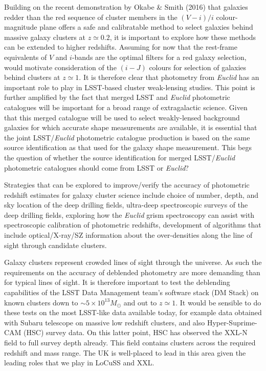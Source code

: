 \documentclass[a4paper,11pt]{article}
\begin{document}
Building on the recent demonstration by Okabe \& Smith (2016) that
galaxies redder than the red sequence of cluster members in the
$(V-i)/i$ colour-magnitude plane offers a safe and calibratable method
to select galaxies behind massive galaxy clusters at $z\simeq0.2$, it
is important to explore how these methods can be extended to higher
redshifts.  Assuming for now that the rest-frame equivalents of $V$
and $i$-bands are the optimal filters for a red galaxy selection,
would motivate consideration of the $(i-J)$ colours for selection of
galaxies behind clusters at $z\simeq1$.  It is therefore clear that
photometry from \emph{Euclid} has an important role to play in
LSST-based cluster weak-lensing studies.  This point is further
amplified by the fact that merged LSST and \emph{Euclid} photometric
catalogues will be important for a broad range of extragalactic
science.  Given that this merged catalogue will be used to select
weakly-lensed background galaxies for which accurate shape
measurements are available, it is essential that the joint
LSST/\emph{Euclid} photometric catalogue production is based on the
same source identification as that used for the galaxy shape
measurement.  This begs the question of whether the source
identification for merged LSST/\emph{Euclid} photometric catalogues
should come from LSST or \emph{Euclid}?

Strategies that can be explored to improve/verify the accuracy of
photometric redshift estimates for galaxy cluster science include
choice of number, depth, and sky location of the deep drilling fields,
ultra-deep spectroscopic surveys of the deep drilling fields,
exploring how the \emph{Euclid} grism spectroscopy can assist with
spectroscopic calibration of photometric redshifts, development of
algorithms that include optical/X-ray/SZ information about the
over-densities along the line of sight through candidate clusters.

Galaxy clusters represent crowded lines of sight through the universe.
As such the requirements on the accuracy of deblended photometry are
more demanding than for typical lines of sight.  It is therefore
important to test the deblending capabilities of the LSST Data
Management team's software stack (DM Stack) on known clusters down to
$\sim5\times10^{13}M_\odot$ and out to $z\simeq1$.  It would be
sensible to do these tests on the most LSST-like data available today,
for example data obtained with Subaru telescope on massive low
redshift clusters, and also Hyper-Suprime-CAM (HSC) survey data.  On
this latter point, HSC has observed the XXL-N field to full survey
depth already.  This field contains clusters across the required
redshift and mass range.  The UK is well-placed to lead in this area
given the leading roles that we play in LoCuSS and XXL.  
\end{document}
